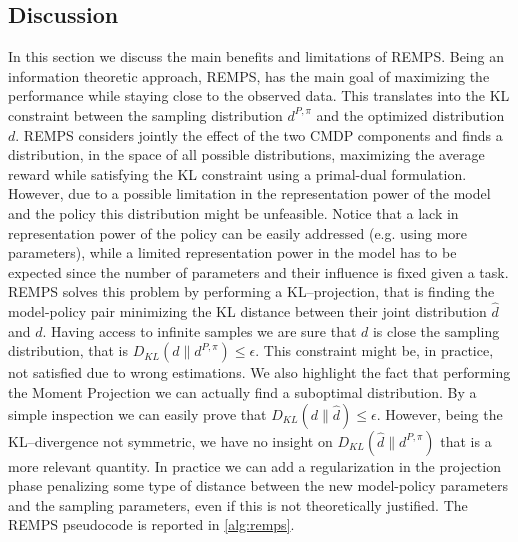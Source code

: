 \subsection{Discussion}
In this section we discuss the main benefits and limitations of REMPS.
Being an information theoretic approach, REMPS, has the main goal of maximizing the performance while staying close to the observed data. This translates into the KL constraint between the sampling distribution $d^{P,\pi}$ and the optimized distribution $d$. REMPS considers jointly the effect of the two CMDP components and finds a distribution, in the space of all possible distributions, maximizing the average reward while satisfying the KL constraint using a primal-dual formulation. However, due to a possible limitation in the representation power of the model and the policy this distribution might be unfeasible. Notice that a lack in representation power of the policy can be easily addressed (e.g. using more parameters), while a limited representation power in the model has to be expected since the number of parameters and their influence is fixed given a task. REMPS solves this problem by performing a KL--projection, that is finding the model-policy pair minimizing the KL distance between their joint distribution $\hat{d}$ and $d$. \newline
Having access to infinite samples we are sure that $d$ is close the sampling distribution, that is $D_{KL}(d \| d^{P,\pi}) \le \epsilon$. This constraint might be, in practice, not satisfied due to wrong estimations. 
We also highlight the fact that performing the Moment Projection we can actually find a suboptimal distribution. By a simple inspection we can easily prove that $D_{KL}(d \| \widehat{d}) \le \epsilon$. However, being the KL--divergence not symmetric, we have no insight on $D_{KL}(\widehat{d} \| d^{P,\pi})$ that is a more relevant quantity. \newline
In practice we can add a regularization in the projection phase penalizing some type of distance between the new model-policy parameters and the sampling parameters, even if this is not theoretically justified. \newline
The REMPS pseudocode is reported in \cref{alg:remps}.

